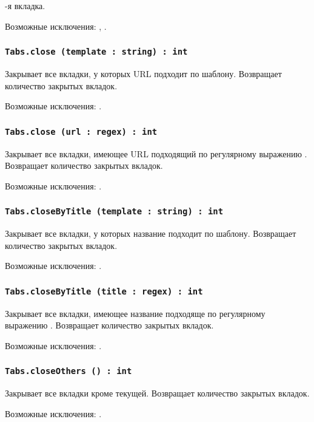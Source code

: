 -я вкладка.

Возможные исключения: , .

\subsubsection{\lstinline|Tabs.close (template : string) : int|}

Закрывает все вкладки, у которых URL подходит по шаблону. Возвращает количество закрытых вкладок.

Возможные исключения: .

\subsubsection{\lstinline|Tabs.close (url : regex) : int|}

Закрывает все вкладки, имеющее URL подходящий по регулярному выражению . Возвращает количество закрытых вкладок.

Возможные исключения: .

\subsubsection{\lstinline|Tabs.closeByTitle (template : string) : int|}

Закрывает все вкладки, у которых название подходит по шаблону. Возвращает количество закрытых вкладок.

Возможные исключения: .

\subsubsection{\lstinline|Tabs.closeByTitle (title : regex) : int|}

Закрывает все вкладки, имеющее название подходяще по регулярному выражению . Возвращает количество закрытых вкладок.

Возможные исключения: .

\subsubsection{\lstinline|Tabs.closeOthers () : int|}

Закрывает все вкладки кроме текущей. Возвращает количество закрытых вкладок.

Возможные исключения: .

